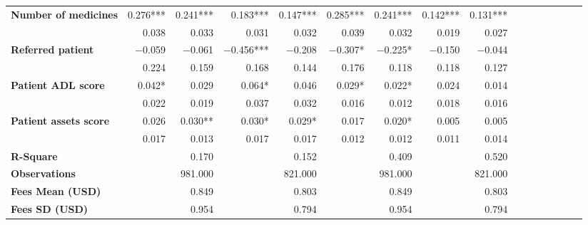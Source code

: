 \begin{tabular}{@{\extracolsep{5pt}}lrrrrrrrrrrrrrrr}
{\bf Number of medicines} & 0.276*** & 0.241*** & 0.183*** & 0.147*** & 0.285*** & 0.241*** & 0.142*** & 0.131*** \\
{\bf } & 0.038\phantom{***} & 0.033\phantom{***} & 0.031\phantom{***} & 0.032\phantom{***} & 0.039\phantom{***} & 0.032\phantom{***} & 0.019\phantom{***} & 0.027\phantom{***} \\
{\bf Referred patient} & $-$0.059\phantom{***} & $-$0.061\phantom{***} & $-$0.456*** & $-$0.208\phantom{***} & $-$0.307*\phantom{**} & $-$0.225*\phantom{**} & $-$0.150\phantom{***} & $-$0.044\phantom{***} \\
{\bf } & 0.224\phantom{***} & 0.159\phantom{***} & 0.168\phantom{***} & 0.144\phantom{***} & 0.176\phantom{***} & 0.118\phantom{***} & 0.118\phantom{***} & 0.127\phantom{***} \\
{\bf Patient ADL score} & 0.042*\phantom{**} & 0.029\phantom{***} & 0.064*\phantom{**} & 0.046\phantom{***} & 0.029*\phantom{**} & 0.022*\phantom{**} & 0.024\phantom{***} & 0.014\phantom{***} \\
{\bf } & 0.022\phantom{***} & 0.019\phantom{***} & 0.037\phantom{***} & 0.032\phantom{***} & 0.016\phantom{***} & 0.012\phantom{***} & 0.018\phantom{***} & 0.016\phantom{***} \\
{\bf Patient assets score} & 0.026\phantom{***} & 0.030**\phantom{*} & 0.030*\phantom{**} & 0.029*\phantom{**} & 0.017\phantom{***} & 0.020*\phantom{**} & 0.005\phantom{***} & 0.005\phantom{***} \\
{\bf } & 0.017\phantom{***} & 0.013\phantom{***} & 0.017\phantom{***} & 0.017\phantom{***} & 0.012\phantom{***} & 0.012\phantom{***} & 0.011\phantom{***} & 0.014\phantom{***} \\
{\bf R-Square} & \phantom{***} & 0.170\phantom{***} & \phantom{***} & 0.152\phantom{***} & \phantom{***} & 0.409\phantom{***} & \phantom{***} & 0.520\phantom{***} \\
{\bf Observations} & \phantom{***} & 981.000\phantom{***} & \phantom{***} & 821.000\phantom{***} & \phantom{***} & 981.000\phantom{***} & \phantom{***} & 821.000\phantom{***} \\
{\bf Fees Mean (USD)} & \phantom{***} & 0.849\phantom{***} & \phantom{***} & 0.803\phantom{***} & \phantom{***} & 0.849\phantom{***} & \phantom{***} & 0.803\phantom{***} \\
{\bf Fees SD (USD)} & \phantom{***} & 0.954\phantom{***} & \phantom{***} & 0.794\phantom{***} & \phantom{***} & 0.954\phantom{***} & \phantom{***} & 0.794\phantom{***} \\
\hline
\end{tabular}
